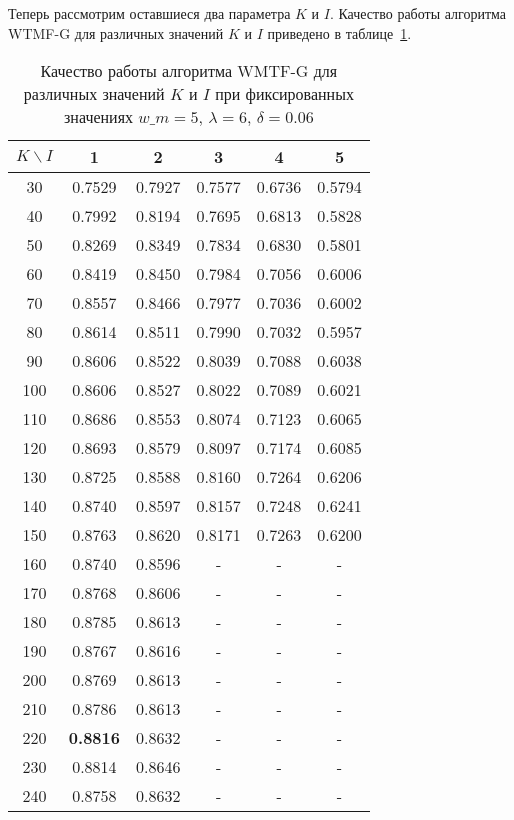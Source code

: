     Теперь рассмотрим оставшиеся два параметра $K$ и $I$. Качество работы алгоритма WTMF-G для различных значений $K$ и $I$ приведено в таблице~\ref{tabular:wtmfg_test5}.
    \begin{table}[h!]
        \caption{Качество работы алгоритма WMTF-G для различных значений $K$ и $I$ при фиксированных значениях $w\_m=5$, $\lambda=6$, $\delta=0.06$ \bigskip}
        \centering
        \label{tabular:wtmfg_test5}
        \begin{tabular}{|c|c|c|c|c|c|} \hline
            $K \backslash I$ & 1 & 2 & 3 & 4 & 5  \\ \hline
            30 & 0.7529 & 0.7927 & 0.7577 & 0.6736 & 0.5794  \\ \hline
            40 & 0.7992 & 0.8194 & 0.7695 & 0.6813 & 0.5828  \\ \hline
            50 & 0.8269 & 0.8349 & 0.7834 & 0.6830 & 0.5801  \\ \hline
            60 & 0.8419 & 0.8450 & 0.7984 & 0.7056 & 0.6006  \\ \hline
            70 & 0.8557 & 0.8466 & 0.7977 & 0.7036 & 0.6002  \\ \hline
            80 & 0.8614 & 0.8511 & 0.7990 & 0.7032 & 0.5957  \\ \hline
            90 & 0.8606 & 0.8522 & 0.8039 & 0.7088 & 0.6038  \\ \hline
            100 & 0.8606 & 0.8527 & 0.8022 & 0.7089 & 0.6021  \\ \hline
            110 & 0.8686 & 0.8553 & 0.8074 & 0.7123 & 0.6065  \\ \hline
            120 & 0.8693 & 0.8579 & 0.8097 & 0.7174 & 0.6085  \\ \hline
            130 & 0.8725 & 0.8588 & 0.8160 & 0.7264 & 0.6206  \\ \hline
            140 & 0.8740 & 0.8597 & 0.8157 & 0.7248 & 0.6241  \\ \hline
            150 & 0.8763 & 0.8620 & 0.8171 & 0.7263 & 0.6200  \\ \hline
            160 & 0.8740 & 0.8596 & - & - & - \\ \hline
            170 & 0.8768 & 0.8606 & - & - & -  \\ \hline
            180 & 0.8785 & 0.8613 & - & - & -  \\ \hline
            190 & 0.8767 & 0.8616 & - & - & -  \\ \hline
            200 & 0.8769 & 0.8613 & - & - & -  \\ \hline
            210 & 0.8786 & 0.8613 & - & - & -  \\ \hline
            220 & \bf{0.8816} & 0.8632 & - & - & -  \\ \hline
            230 & 0.8814 & 0.8646 & - & - & -  \\ \hline
            240 & 0.8758 & 0.8632 & - & - & -  \\ \hline
        \end{tabular}
    \end{table}
